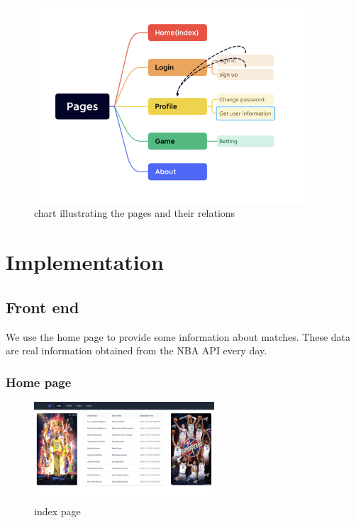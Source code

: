 \documentclass[singlecolumn]{article}
\begin{document}
\begin{figure}[H]
    \centering
    \includegraphics[width=0.9\textwidth]{pages.png}
    \caption{chart illustrating the pages and their relations}
    \label{fig:pages}
\end{figure}


\section{Implementation}

\subsection{Front end}

We use the home page to provide some information about matches. These data are real information obtained from the NBA API every day.

\subsubsection{Home page}

\begin{figure}[H]
    \centering
    \includegraphics[width=0.6\textwidth]{index.png}
    \caption{index page}
    \label{fig:index}
\end{figure}
\end{document}
